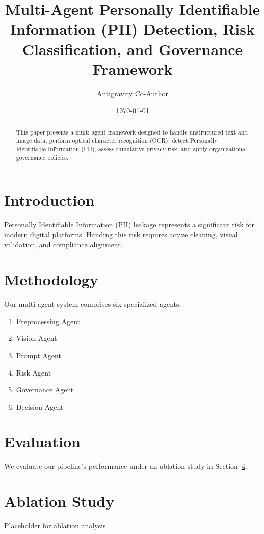 \documentclass{article}
\title{Multi-Agent Personally Identifiable Information (PII) Detection, Risk Classification, and Governance Framework}
\author{Antigravity Co-Author}
\date{\today}
\begin{document}
\maketitle

\begin{abstract}
This paper presents a multi-agent framework designed to handle unstructured text and image data, perform optical character recognition (OCR), detect Personally Identifiable Information (PII), assess cumulative privacy risk, and apply organizational governance policies.
\end{abstract}

\section{Introduction}
Personally Identifiable Information (PII) leakage represents a significant risk for modern digital platforms. Handing this risk requires active cleaning, visual validation, and compliance alignment.

\section{Methodology}
Our multi-agent system comprises six specialized agents:
\begin{enumerate}
    \item Preprocessing Agent
    \item Vision Agent
    \item Prompt Agent
    \item Risk Agent
    \item Governance Agent
    \item Decision Agent
\end{enumerate}

\section{Evaluation}
We evaluate our pipeline's performance under an ablation study in Section~\ref{sec:ablation}.

\section{Ablation Study}
\label{sec:ablation}
Placeholder for ablation analysis.
\end{document}
